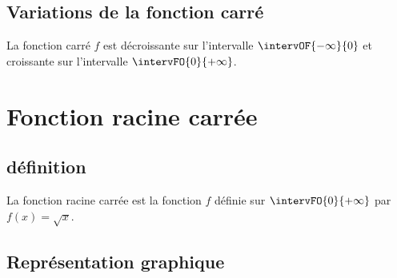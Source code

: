     \subsection{Variations de la fonction carré}
    
    \begin{bprop}
        La fonction carré $f$ est décroissante sur l'intervalle $\intervOF{-\infty}{0}$ et croissante sur l'intervalle $\intervFO{0}{+\infty}$.
    \end{bprop}
    

\section{Fonction racine carrée}
    \subsection{définition}
    \begin{bdefi}
        La fonction racine carrée est la fonction $f$ définie sur $\intervFO{0}{+\infty}$ par $f(x)=\sqrt{x}$.
    \end{bdefi}
    
    \subsection{Représentation graphique}
    
